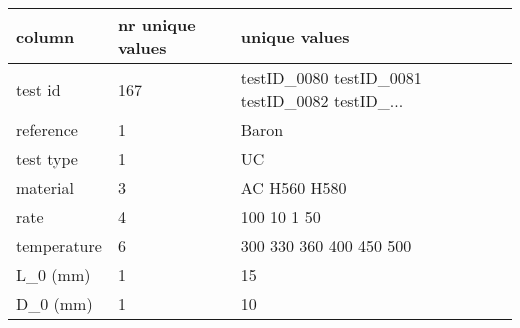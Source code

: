 \begin{tabular}{lll}
\toprule
     column & nr unique values &                                      unique values \\
\midrule
    test id &              167 & testID_0080 testID_0081 testID_0082 testID_... \\
  reference &                1 &                                            Baron \\
  test type &                1 &                                               UC \\
   material &                3 &                                   AC H560 H580 \\
       rate &                4 &                                   100 10 1 50 \\
temperature &                6 &                     300 330 360 400 450 500 \\
   L_0 (mm) &                1 &                                               15 \\
   D_0 (mm) &                1 &                                               10 \\
\bottomrule
\end{tabular}
